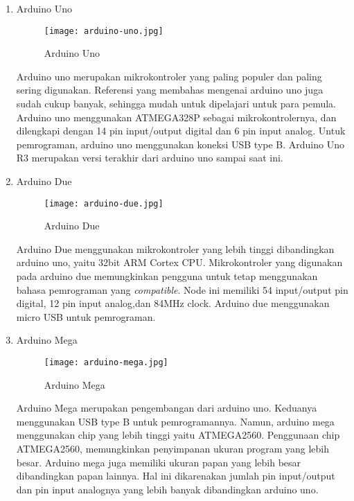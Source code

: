 \begin{enumerate}
    \item Arduino Uno
    
    \begin{figure}[H]
    	\centering  
    	\texttt{[image: arduino-uno.jpg]}  
    	\caption[Arduino Uno]{Arduino Uno} 
    	\label{fig:Arduino Uno} 
    \end{figure} 

    Arduino uno merupakan mikrokontroler yang paling populer dan paling sering digunakan. Referensi yang membahas mengenai arduino uno juga sudah cukup banyak, sehingga mudah untuk dipelajari untuk para pemula. Arduino uno menggunakan ATMEGA328P sebagai mikrokontrolernya, dan dilengkapi dengan 14 pin input/output digital dan 6 pin input analog. Untuk pemrograman, arduino uno menggunakan koneksi USB type B. Arduino Uno R3 merupakan versi terakhir dari arduino uno sampai saat ini.
    
    \item Arduino Due
    
    \begin{figure}[H]
    	\centering  
    	\texttt{[image: arduino-due.jpg]}  
    	\caption[Arduino Due]{Arduino Due} 
    	\label{fig:Arduino Due} 
    \end{figure} 
    
    Arduino Due menggunakan mikrokontroler yang lebih tinggi dibandingkan arduino uno, yaitu 32bit ARM Cortex CPU. Mikrokontroler yang digunakan pada arduino due memungkinkan pengguna untuk tetap menggunakan bahasa pemrograman yang \textit{compatible}. Node ini memiliki 54 input/output pin digital, 12 pin input analog,dan 84MHz clock. Arduino due menggunakan micro USB untuk pemrograman.
    
    \item Arduino Mega
    
    \begin{figure}[H]
    	\centering  
    	\texttt{[image: arduino-mega.jpg]}  
    	\caption[Arduino Mega]{Arduino Mega} 
    	\label{fig:Arduino Mega} 
    \end{figure} 
    
    Arduino Mega merupakan pengembangan dari arduino uno. Keduanya menggunakan USB type B untuk pemrogramannya. Namun, arduino mega menggunakan chip yang lebih tinggi yaitu ATMEGA2560. Penggunaan chip ATMEGA2560, memungkinkan penyimpanan ukuran program yang lebih besar. Arduino mega juga memiliki ukuran papan yang lebih besar dibandingkan papan lainnya. Hal ini dikarenakan jumlah pin input/output dan pin input analognya yang lebih banyak dibandingkan arduino uno.
    

\end{enumerate}
